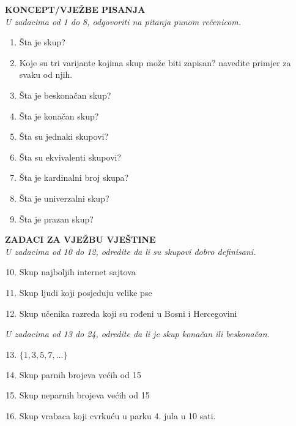 \documentclass[a4paper,14pt,svgnames]{article}
\newcounter{counter}
\begin{document}
\begin{tcolorbox}[title=\textbf{ZADACI ZA VJEŽBU}]
\begin{minipage}{0.5\textwidth}
\textbf{KONCEPT/VJEŽBE PISANJA}\\
\textit{U zadacima od 1 do 8, odgovoriti na pitanja punom rečenicom.}
\begin{enumerate}
\item Šta je skup?
\item Koje su tri varijante kojima skup može biti zapisan? navedite primjer za svaku od njih.
\item Šta je beskonačan skup?
\item Šta je konačan skup?
\item Šta su jednaki skupovi?
\item Šta su ekvivalenti skupovi?
\item Šta je kardinalni broj skupa?
\item Šta je univerzalni skup?
\item Šta je prazan skup?
\end{enumerate}
\end{minipage}
\begin{minipage}{0.5\textwidth}
\textbf{ZADACI ZA VJEŽBU VJEŠTINE}\\
\textit{U zadacima od 10 do 12, odredite da li su skupovi dobro definisani.}
\begin{enumerate}
\setcounter{enumi}{9}
\item Skup najboljih internet sajtova
\item Skup ljudi koji posjeduju velike pse
\item Skup učenika razreda koji su rođeni u Bosni i Hercegovini
\end{enumerate}
\textit{U zadacima od 13 do 24, odredite da li je skup konačan ili beskonačan}.
\begin{enumerate}
\setcounter{enumi}{12}
\item $\{1, 3, 5, 7, ...\}$
\item Skup parnih brojeva većih od 15
\item Skup neparnih brojeva većih od 15
\item Skup vrabaca koji cvrkuću u parku 4. jula u 10 sati.
\end{enumerate}
\end{minipage}
\end{tcolorbox}
\end{document}
